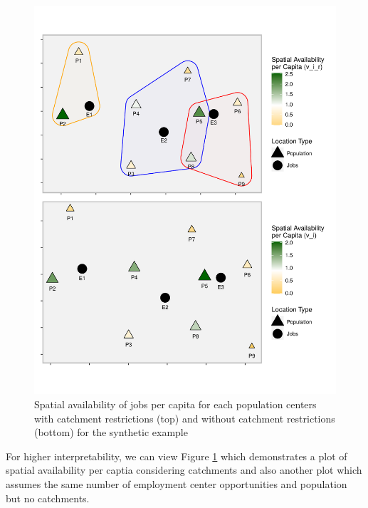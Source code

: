\documentclass[]{elsarticle} %
\begin{document}
\begin{figure}
\includegraphics[width=1\linewidth]{Spatial-Availability_files/figure-latex/toy-example-availability-jobs-per-capita-1} \caption{\label{fig:toy-example-availability-jobs-per-capita} Spatial availability of jobs per capita for each population centers with catchment restrictions (top) and without catchment restrictions (bottom) for the synthetic example}\label{fig:toy-example-availability-jobs-per-capita}
\end{figure}

For higher interpretability, we can view Figure
\ref{fig:toy-example-availability-jobs-per-capita} which demonstrates a
plot of spatial availability per captia considering catchments and also
another plot which assumes the same number of employment center
opportunities and population but no catchments.
\end{document}
